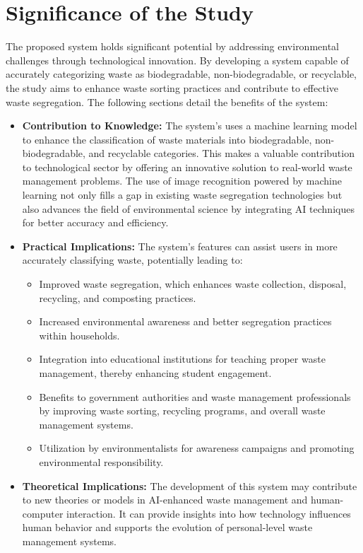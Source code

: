 \section{Significance of the Study}

The proposed system holds significant potential by addressing environmental challenges through technological innovation. By developing a system capable of accurately categorizing waste as biodegradable, non-biodegradable, or recyclable, the study aims to enhance waste sorting practices and contribute to effective waste segregation. The following sections detail the benefits of the system:

\begin{itemize}
	\item \textbf{Contribution to Knowledge:} The system’s uses a machine learning model to enhance the classification of waste materials into biodegradable, non-biodegradable, and recyclable categories. This makes a valuable contribution to technological sector by offering an innovative solution to real-world waste management problems. The use of image recognition powered by machine learning not only fills a gap in existing waste segregation technologies but also advances the field of environmental science by integrating AI techniques for better accuracy and efficiency.
	
	\item \textbf{Practical Implications:} The system’s features can assist users in more accurately classifying waste, potentially leading to:
	\begin{itemize}
		\item Improved waste segregation, which enhances waste collection, disposal, recycling, and composting practices.
		\item Increased environmental awareness and better segregation practices within households.
		\item Integration into educational institutions for teaching proper waste management, thereby enhancing student engagement.
		\item Benefits to government authorities and waste management professionals by improving waste sorting, recycling programs, and overall waste management systems.
		\item Utilization by environmentalists for awareness campaigns and promoting environmental responsibility.
	\end{itemize}
	
	\item \textbf{Theoretical Implications:} The development of this system may contribute to new theories or models in AI-enhanced waste management and human-computer interaction. It can provide insights into how technology influences human behavior and supports the evolution of personal-level waste management systems.
	

\end{itemize}
